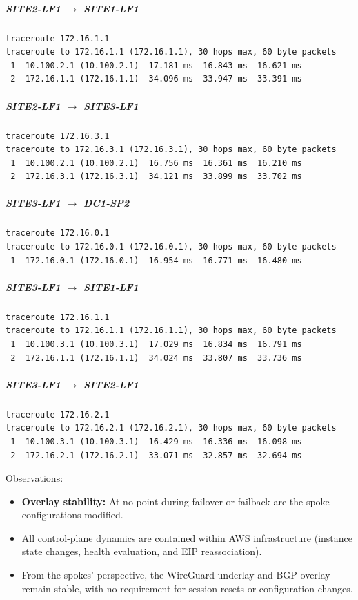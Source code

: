 \documentclass[11pt]{article}
\begin{document}
\subparagraph{SITE2-LF1 $\rightarrow$ SITE1-LF1}

\begin{verbatim}
traceroute 172.16.1.1
traceroute to 172.16.1.1 (172.16.1.1), 30 hops max, 60 byte packets
 1  10.100.2.1 (10.100.2.1)  17.181 ms  16.843 ms  16.621 ms
 2  172.16.1.1 (172.16.1.1)  34.096 ms  33.947 ms  33.391 ms
\end{verbatim}

\subparagraph{SITE2-LF1 $\rightarrow$ SITE3-LF1}

\begin{verbatim}
traceroute 172.16.3.1
traceroute to 172.16.3.1 (172.16.3.1), 30 hops max, 60 byte packets
 1  10.100.2.1 (10.100.2.1)  16.756 ms  16.361 ms  16.210 ms
 2  172.16.3.1 (172.16.3.1)  34.121 ms  33.899 ms  33.702 ms
\end{verbatim}

\subparagraph{SITE3-LF1 $\rightarrow$ DC1-SP2}

\begin{verbatim}
traceroute 172.16.0.1
traceroute to 172.16.0.1 (172.16.0.1), 30 hops max, 60 byte packets
 1  172.16.0.1 (172.16.0.1)  16.954 ms  16.771 ms  16.480 ms
\end{verbatim}

\subparagraph{SITE3-LF1 $\rightarrow$ SITE1-LF1}

\begin{verbatim}
traceroute 172.16.1.1
traceroute to 172.16.1.1 (172.16.1.1), 30 hops max, 60 byte packets
 1  10.100.3.1 (10.100.3.1)  17.029 ms  16.834 ms  16.791 ms
 2  172.16.1.1 (172.16.1.1)  34.024 ms  33.807 ms  33.736 ms
\end{verbatim}

\subparagraph{SITE3-LF1 $\rightarrow$ SITE2-LF1}

\begin{verbatim}
traceroute 172.16.2.1
traceroute to 172.16.2.1 (172.16.2.1), 30 hops max, 60 byte packets
 1  10.100.3.1 (10.100.3.1)  16.429 ms  16.336 ms  16.098 ms
 2  172.16.2.1 (172.16.2.1)  33.071 ms  32.857 ms  32.694 ms
\end{verbatim}

Observations:

\begin{itemize}
  \item \textbf{Overlay stability:}
        At no point during failover or failback are the spoke configurations modified.
  \item All control-plane dynamics are contained within AWS infrastructure
        (instance state changes, health evaluation, and EIP reassociation).
  \item From the spokes’ perspective, the WireGuard underlay and BGP overlay remain stable,
        with no requirement for session resets or configuration changes.
\end{itemize}
\end{document}
